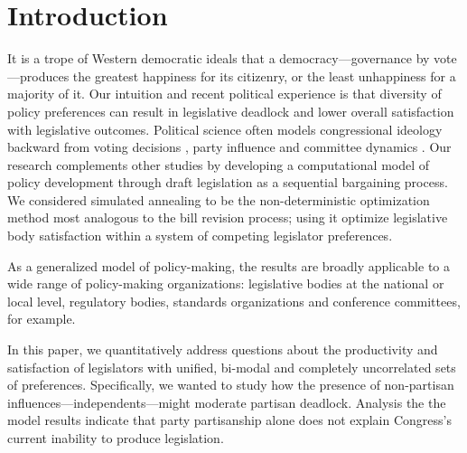 \documentclass[pdftex,12pt,oribibl]{llncs}
\begin{document}
\section{Introduction}
%
%
%
%

It is a trope of Western democratic ideals that a democracy---governance by vote---produces the greatest happiness for its citizenry, or the least unhappiness for a majority of it.
Our intuition and recent political experience is that diversity of policy preferences can result in legislative deadlock and lower overall satisfaction with legislative outcomes.
Political science often models congressional ideology backward from voting decisions \parencite{m74, k89}, party influence \parencite{cm93,cm05,a95,k91, k98} and committee dynamics \parencite{sw87, gk89, m04}.
Our research complements other studies by developing a computational model of policy development through draft legislation as a sequential bargaining process.
We considered simulated annealing to be the non-deterministic optimization method most analogous to the bill revision process; using it optimize legislative body satisfaction within a system of competing legislator preferences.

As a generalized model of policy-making, the results are broadly applicable to a wide range of policy-making organizations: legislative bodies at the national or local level, regulatory bodies, standards organizations and conference committees, for example.

In this paper, we quantitatively address questions about the productivity and satisfaction of legislators with unified, bi-modal and completely uncorrelated sets of preferences. 
Specifically, we wanted to study how the presence of non-partisan influences---independents---might moderate partisan deadlock. 
Analysis the the model results indicate that party partisanship alone does not explain Congress's current inability to produce legislation.
\end{document}
